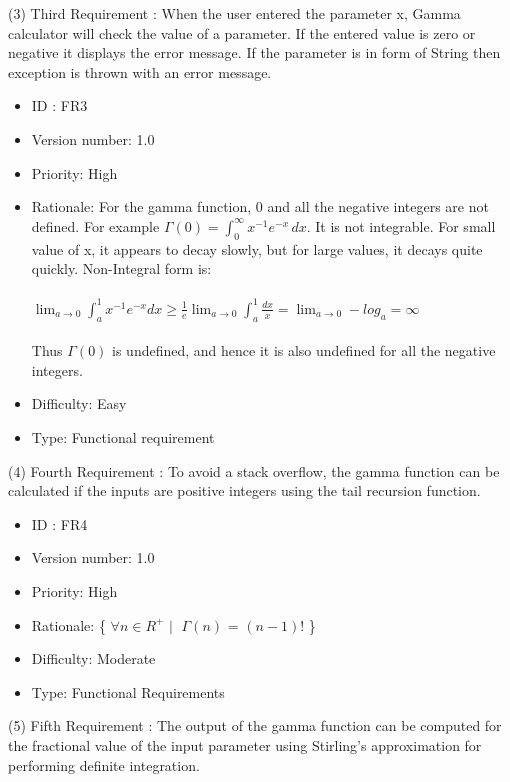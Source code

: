 \documentclass[a4paper, 11pt]{article}
\begin{document}
(3) Third Requirement : When the user entered the parameter x, Gamma calculator will check the value of a parameter. If the entered value is zero or negative it displays the error message. If the parameter is in form of String then exception is thrown with an error message.

\begin{itemize}
    \item ID : FR3
    \item Version number: 1.0
    \item Priority: High
    \item Rationale: For the gamma function, 0 and all the negative integers are not defined. For example ${\displaystyle \Gamma (0)=\int _{0}^{\infty }x^{-1}e^{-x}\,dx}$. It is not integrable. For small value of x, it appears to decay slowly, but for large values, it decays quite quickly. Non-Integral form is: \\\\
     $\lim_{a \to 0}\int _{a}^{1}x^{-1}e^{-x}dx \geq \frac{1}{e}\lim_{a \to 0}\int _{a}^{1} \frac{dx}{x}=\lim_{a \to 0}-log_a=\infty$ \\\\
    Thus $\Gamma \left( 0 \right)$ is undefined, and hence it is also undefined for all the negative integers.
    \item Difficulty: Easy
    \item Type: Functional requirement
\end{itemize}

(4) Fourth Requirement : To avoid a stack overflow, the gamma function can be calculated if the inputs are positive integers using the tail recursion function.

\begin{itemize}
    \item ID : FR4
    \item Version number: 1.0
    \item Priority: High
    \item Rationale: \{ $\forall n \in R^+$ $\mid\;$  $\Gamma(n)$ = $(n-1)! $ \}
    \item Difficulty: Moderate
    \item Type: Functional Requirements
\end{itemize}

(5) Fifth Requirement : The output of the gamma function can be computed for the fractional value of the input parameter using Stirling's approximation for performing definite integration.
\end{document}
